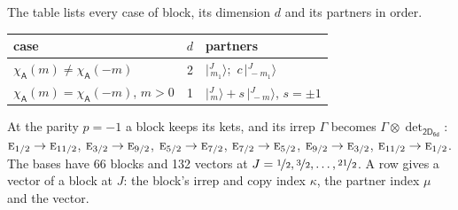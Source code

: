 \documentclass[10pt,a4paper]{article}
\numberwithin{equation}{section}
\newcommand{\grp}[1]{\mathsf{#1}}
\newcommand{\irr}[1]{\text{\normalfont\scshape #1}}
\newcommand{\chiA}{\chi_{\grp{A}}}
\newcommand{\irrprod}{\otimes}
\newcommand{\mult}{\kappa}
\newcommand{\intx}{\mu}
\newcommand{\jm}[2]{\bigl\lvert{}^{#1}_{\,#2}\bigr\rangle}
\begin{document}
\leavevmode\label{n:head.case}\label{n:head.partners}The table lists every case of block, its dimension $d$ and its partners in order.
\begin{center}\begin{tabular}{@{}lrl@{}}\toprule
case & $d$ & partners\\\midrule
$\chiA(m) \ne \chiA(-m)$ & 2 & $\jm{J}{m_1}$;\ $c\,\jm{J}{-m_1}$\\
$\chiA(m) = \chiA(-m)$, $m > 0$ & 1 & $\jm{J}{m} + s\,\jm{J}{-m}$, $s = \pm1$\\
\bottomrule\end{tabular}\end{center}
At the parity $p = -1$ a block keeps its kets, and its irrep $\Gamma$ becomes $\Gamma \irrprod \det_{\grp{2D_{6d}}}$: $\irr{e}_{1/2} \to \irr{e}_{11/2}$, $\irr{e}_{3/2} \to \irr{e}_{9/2}$, $\irr{e}_{5/2} \to \irr{e}_{7/2}$, $\irr{e}_{7/2} \to \irr{e}_{5/2}$, $\irr{e}_{9/2} \to \irr{e}_{3/2}$, $\irr{e}_{11/2} \to \irr{e}_{1/2}$.
The bases have 66 blocks and 132 vectors at $J = \nicefrac{1}{2}, \nicefrac{3}{2}, \dots, \nicefrac{21}{2}$. \label{n:head.vector}A row gives a vector of a block at $J$: the block's irrep and copy index $\mult$, the partner index $\intx$ and the vector.
\end{document}
